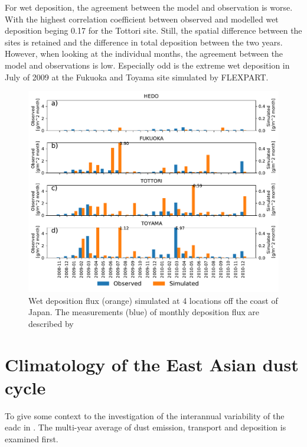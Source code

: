 For wet deposition, the agreement between the model and observation is worse. 
With the highest correlation coefficient between observed and modelled wet deposition  beging 0.17 for the Tottori site.  
Still, the spatial difference between the sites is retained and the difference in total deposition between the two years. 
However, when looking at the individual months, the agreement between the model and observations is low. 
Especially odd is the extreme wet deposition in July of 2009 at the Fukuoka and Toyama site simulated by FLEXPART. 

\begin{figure}[hptb]
    \centering
    \includegraphics[width=\textwidth]{texfiles/figs/monthly_accumulated_wet_depostion_japan.pdf}
    \caption{Wet deposition flux (orange) simulated at 4 locations off the coast of Japan. The measurements (blue) of monthly deposition flux are described by \textcite{osada2014wet}}
    \label{fig:model_eval_wet_deposition}
\end{figure}

\section{Climatology of the East Asian dust cycle}\label{sec:result_average}
To give some context to the investigation of the interannual variability of the \acrshort{eadc} in . The multi-year average of dust emission, transport and deposition is examined first. 
